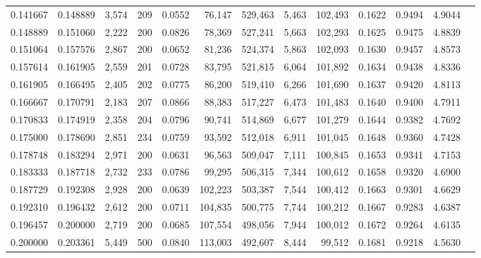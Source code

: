 \begin{tabular}{rrrrrrrrrrrrr}
0.141667 & 0.148889 &  3,574 &   209 &                                     0.0552 &  76,147 & 529,463 &   5,463 & 102,493 & 0.1622 & 0.9494 & 4.9044 \\
0.148889 & 0.151060 &  2,222 &   200 &                                     0.0826 &  78,369 & 527,241 &   5,663 & 102,293 & 0.1625 & 0.9475 & 4.8839 \\
0.151064 & 0.157576 &  2,867 &   200 &                                     0.0652 &  81,236 & 524,374 &   5,863 & 102,093 & 0.1630 & 0.9457 & 4.8573 \\
0.157614 & 0.161905 &  2,559 &   201 &                                     0.0728 &  83,795 & 521,815 &   6,064 & 101,892 & 0.1634 & 0.9438 & 4.8336 \\
0.161905 & 0.166495 &  2,405 &   202 &                                     0.0775 &  86,200 & 519,410 &   6,266 & 101,690 & 0.1637 & 0.9420 & 4.8113 \\
0.166667 & 0.170791 &  2,183 &   207 &                                     0.0866 &  88,383 & 517,227 &   6,473 & 101,483 & 0.1640 & 0.9400 & 4.7911 \\
0.170833 & 0.174919 &  2,358 &   204 &                                     0.0796 &  90,741 & 514,869 &   6,677 & 101,279 & 0.1644 & 0.9382 & 4.7692 \\
0.175000 & 0.178690 &  2,851 &   234 &                                     0.0759 &  93,592 & 512,018 &   6,911 & 101,045 & 0.1648 & 0.9360 & 4.7428 \\
0.178748 & 0.183294 &  2,971 &   200 &                                     0.0631 &  96,563 & 509,047 &   7,111 & 100,845 & 0.1653 & 0.9341 & 4.7153 \\
0.183333 & 0.187718 &  2,732 &   233 &                                     0.0786 &  99,295 & 506,315 &   7,344 & 100,612 & 0.1658 & 0.9320 & 4.6900 \\
0.187729 & 0.192308 &  2,928 &   200 &                                     0.0639 & 102,223 & 503,387 &   7,544 & 100,412 & 0.1663 & 0.9301 & 4.6629 \\
0.192310 & 0.196432 &  2,612 &   200 &                                     0.0711 & 104,835 & 500,775 &   7,744 & 100,212 & 0.1667 & 0.9283 & 4.6387 \\
0.196457 & 0.200000 &  2,719 &   200 &                                     0.0685 & 107,554 & 498,056 &   7,944 & 100,012 & 0.1672 & 0.9264 & 4.6135 \\
0.200000 & 0.203361 &  5,449 &   500 &                                     0.0840 & 113,003 & 492,607 &   8,444 &  99,512 & 0.1681 & 0.9218 & 4.5630 \\

\end{tabular}
